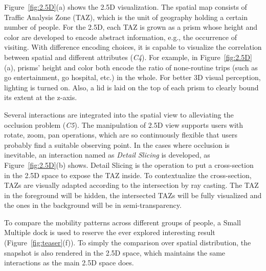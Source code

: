 Figure~\ref{fig:2.5D}(a) shows the 2.5D visualization. The spatial map consists of Traffic Analysis Zone (TAZ), which is the unit of geography holding a certain number of people. For the 2.5D, each TAZ is grown as a prism whose height and color are developed to encode abstract information, e.g., the occurrence of visiting. With difference encoding choices, it is capable to visualize the correlation between spatial and different attributes (\textit{C4}). For example, in Figure~\ref{fig:2.5D}(a), prisms' height and color both encode the ratio of none-routine trips (such as go entertainment, go hospital, etc.) in the whole. For better 3D visual perception, lighting is turned on. Also, a lid is laid on the top of each prism to clearly bound its extent at the z-axis.

Several interactions are integrated into the spatial view to alleviating the occlusion problem (\textit{C5}). The manipulation of 2.5D view supports users with rotate, zoom, pan operations, which are so continuously flexible that users probably find a suitable observing point. In the cases where occlusion is inevitable, an interaction named as \textit{Detail Slicing} is developed, as Figure~\ref{fig:2.5D}(b) shows. Detail Slicing is the operation to put a cross-section in the 2.5D space to expose the TAZ inside. To contextualize the cross-section, TAZs are visually adapted according to the intersection by ray casting. The TAZ in the foreground will be hidden, the intersected TAZs will be fully visualized and the ones in the background will be in semi-transparency.


To compare the mobility patterns across different groups of people, a Small Multiple dock is used to reserve the ever explored interesting result (Figure~\ref{fig:teaser}(f)). To simply the comparison over spatial distribution, the snapshot is also rendered in the 2.5D space, which maintains the same interactions as the main 2.5D space does.
\fi





